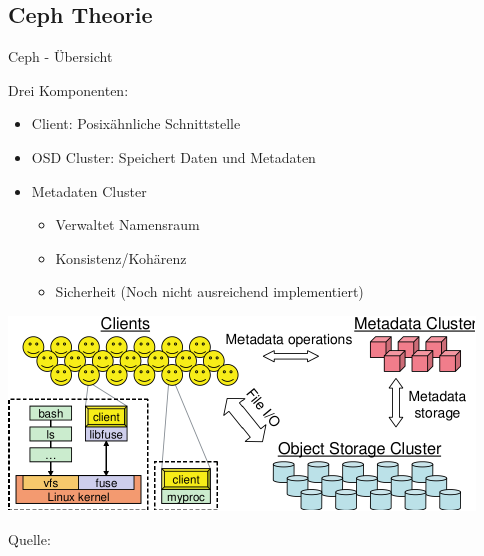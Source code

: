 \documentclass[hyperref={xetex}]{beamer}
\begin{document}
\subsection{Ceph Theorie}

\begin{frame}{Ceph - \"Ubersicht}
	
	Drei Komponenten:
	\begin{itemize}
        \item \alert{Client:} Posix\"ahnliche Schnittstelle %
        \item \alert{OSD Cluster:} Speichert Daten und Metadaten
        \item \alert{Metadaten Cluster}
			\begin{itemize}
				\item Verwaltet Namensraum
				\item Konsistenz/Koh\"arenz
				\item Sicherheit (Noch nicht ausreichend implementiert)
			\end{itemize}
	\end{itemize}
\end{frame}

\begin{frame}
	\begin{center}
		\includegraphics{images/ceph_architecture.pdf}
	\end{center}
    Quelle: \cite{weil_ceph:_2006}
\end{frame}
\end{document}

